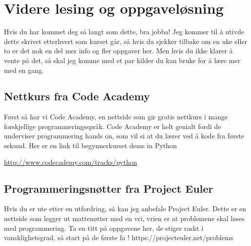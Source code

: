 \documentclass[a4paper, 11pt, notitlepage]{article}
\begin{document}
\clearpage

\section*{Videre lesing og oppgaveløsning}

Hvis du har kommet deg så langt som dette, bra jobba! Jeg kommer til å utivde dette skrivet etterhvert som kurset går, så hvis du sjekker tilbake om en uke eller to er det nok en del mer info og fler oppgaver her. Men hvis du ikke klarer å vente på det, så skal jeg komme med et par kilder du kan bruke for å lære mer med en gang.

\subsection*{Nettkurs fra Code Academy}

Først så har vi Code Academy, en nettside som gir gratis nettkurs i mange forskjellige programmeringsspråk. Code Academy er helt genialt fordi de underviser programmering hands on, som vil si at du lærer ved å kode fra første sekund. Her er en link til begynnerkurset dems in Python

\url{http://www.codecademy.com/tracks/python}


\subsection*{Programmeringsnøtter fra Project Euler}

Hvis du er ute etter en utfordring, så kan jeg anbefale Project Euler. Dette er en nettside som legger ut mattenøtter med en vri, vrien er at problemene skal løses med programmering. Ta en titt på oppgavene her, de stiger raskt i vansklighetsgrad, så start på de første
fa
!
https://projecteuler.net/problems





\end{document}
